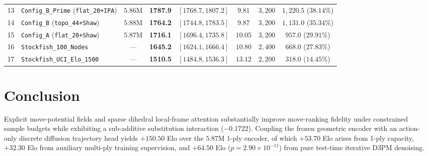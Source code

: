 \documentclass[10pt]{article}
\begin{document}
\begin{table}[h!]
\begin{tabular}{clcccccc}
13 & \texttt{Config\_B\_Prime} (\texttt{flat\_20+IPA}) & $5.86\text{M}$ & \textbf{1787.9} & $[1768.7, 1807.2]$ & $9.81$ & $3{,}200$ & $1{,}220.5$ ($38.14\%$) \\
14 & \texttt{Config\_B} (\texttt{topo\_44+Shaw}) & $5.88\text{M}$ & \textbf{1764.2} & $[1744.8, 1783.5]$ & $9.87$ & $3{,}200$ & $1{,}131.0$ ($35.34\%$) \\
15 & \texttt{Config\_A} (\texttt{flat\_20+Shaw}) & $5.87\text{M}$ & \textbf{1716.1} & $[1696.4, 1735.8]$ & $10.05$ & $3{,}200$ & $957.0$ ($29.91\%$) \\
16 & \texttt{Stockfish\_100\_Nodes} & --- & \textbf{1645.2} & $[1624.1, 1666.4]$ & $10.80$ & $2{,}400$ & $668.0$ ($27.83\%$) \\
17 & \texttt{Stockfish\_UCI\_Elo\_1500} & --- & \textbf{1510.5} & $[1484.8, 1536.3]$ & $13.12$ & $2{,}200$ & $318.0$ ($14.45\%$) \\
\bottomrule
\end{tabular}
\end{table}

\section{Conclusion}
Explicit move-potential fields and sparse dihedral local-frame attention substantially improve move-ranking fidelity under constrained sample budgets while exhibiting a sub-additive substitution interaction ($-0.1722$). Coupling the frozen geometric encoder with an action-only discrete diffusion trajectory head yields $+150.50$ Elo over the $5.87\text{M}$ 1-ply encoder, of which $+53.70$ Elo arises from 1-ply capacity, $+32.30$ Elo from auxiliary multi-ply training supervision, and $+64.50$ Elo ($p = 2.90 \times 10^{-11}$) from pure test-time iterative D3PM denoising.
\end{document}
